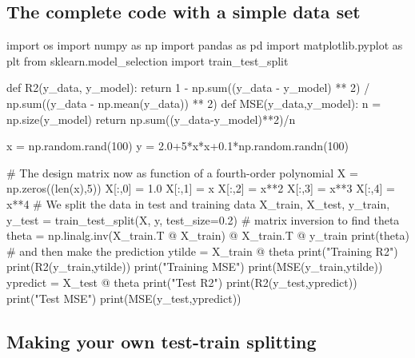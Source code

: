 \documentclass[%
oneside,                 %
final,                   %
10pt]{article}
\begin{document}
\subsection{The complete code with a simple data set}










































\bpycod
import os
import numpy as np
import pandas as pd
import matplotlib.pyplot as plt
from sklearn.model_selection import train_test_split


def R2(y_data, y_model):
    return 1 - np.sum((y_data - y_model) ** 2) / np.sum((y_data - np.mean(y_data)) ** 2)
def MSE(y_data,y_model):
    n = np.size(y_model)
    return np.sum((y_data-y_model)**2)/n

x = np.random.rand(100)
y = 2.0+5*x*x+0.1*np.random.randn(100)


#  The design matrix now as function of a fourth-order polynomial
X = np.zeros((len(x),5))
X[:,0] = 1.0
X[:,1] = x
X[:,2] = x**2
X[:,3] = x**3
X[:,4] = x**4
# We split the data in test and training data
X_train, X_test, y_train, y_test = train_test_split(X, y, test_size=0.2)
# matrix inversion to find theta
theta = np.linalg.inv(X_train.T @ X_train) @ X_train.T @ y_train
print(theta)
# and then make the prediction
ytilde = X_train @ theta
print("Training R2")
print(R2(y_train,ytilde))
print("Training MSE")
print(MSE(y_train,ytilde))
ypredict = X_test @ theta
print("Test R2")
print(R2(y_test,ypredict))
print("Test MSE")
print(MSE(y_test,ypredict))

\epycod


\subsection{Making your own test-train splitting}
\end{document}

